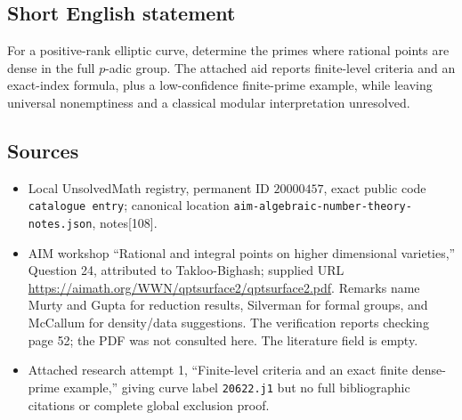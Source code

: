 \documentclass[11pt]{article}
\begin{document}
\subsection{Short English statement}
For a positive-rank elliptic curve, determine the primes where rational points are dense in the full \(p\)-adic group. The attached aid reports finite-level criteria and an exact-index formula, plus a low-confidence finite-prime example, while leaving universal nonemptiness and a classical modular interpretation unresolved.
\subsection{Sources}
\begin{itemize}
\item Local UnsolvedMath registry, permanent ID \(20000457\), exact public code \texttt{catalogue entry}; canonical location \texttt{aim-algebraic-number-theory-notes.json}, notes[108].
\item AIM workshop ``Rational and integral points on higher dimensional varieties,'' Question 24, attributed to Takloo-Bighash; supplied URL \url{https://aimath.org/WWN/qptsurface2/qptsurface2.pdf}. Remarks name Murty and Gupta for reduction results, Silverman for formal groups, and McCallum for density/data suggestions. The verification reports checking page 52; the PDF was not consulted here. The literature field is empty.
\item Attached research attempt 1, ``Finite-level criteria and an exact finite dense-prime example,'' giving curve label \texttt{20622.j1} but no full bibliographic citations or complete global exclusion proof.
\end{itemize}
\end{document}
